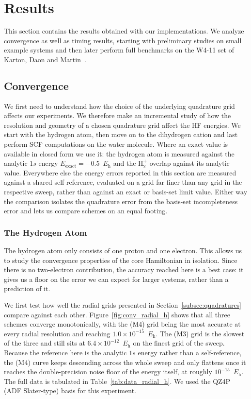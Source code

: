 \documentclass{article}
\begin{document}
\section{Results}\label{sec:results}

This section contains the results obtained with our implementations.
We analyze convergence as well as timing results, starting with
preliminary studies on small example systems and then
later perform full benchmarks on the W4-11 set of Karton, Daon and
Martin~\cite{Karton11w411}.

\subsection{Convergence}\label{subsec:convergence}

We first need to understand how the choice of the underlying
quadrature grid affects our experiments. We therefore make an
incremental study of how the resolution and geometry of a chosen
quadrature grid affect the HF energies. We start with the hydrogen
atom, then move on to the dihydrogen cation and last
perform SCF computations on the water molecule. Where an exact value is
available in closed form we use it: the hydrogen atom is measured
against the analytic $1s$ energy $E_\mathrm{exact}=-0.5$~\( E_\mathrm
h \) and the
H$_2^+$ overlap against its analytic value. Everywhere else the energy
errors reported in this section are measured against a shared
self-reference, evaluated on a grid far finer than any grid in the
respective sweep, rather than against an exact or basis-set limit
value. Either way the comparison isolates the quadrature error from the
basis-set incompleteness error and lets us compare schemes on an equal
footing.

\subsubsection{The Hydrogen Atom}

The hydrogen atom only consists of one proton and one
electron. This allows us to study the convergence properties of the core
Hamiltonian in isolation. Since there is no two-electron contribution,
the accuracy reached here is a best case: it gives us a floor on the
error we can expect for larger systems, rather than a prediction of it.

We first test how well the radial grids presented in
Section~\ref{subsec:quadratures} compare against each other.
Figure~\ref{fig:conv_radial_h} shows that all three schemes converge
monotonically, with the (M4) grid being the most accurate at every
radial resolution and reaching \( 1.0 \times 10^{-15} \)~\( E_\mathrm
h \). The (M3)
grid is the slowest of the three and still sits at \( 6.4 \times
10^{-12} \)~\( E_\mathrm h \) on the finest grid of the sweep.
Because the reference
here is the analytic $1s$ energy rather than a self-reference, the (M4)
curve keeps descending across the whole sweep and only flattens once it
reaches the double-precision noise floor of the energy itself, at
roughly \( 10^{-15} \)~\( E_\mathrm h \). The full data is tabulated in
Table~\ref{tab:data_radial_h}. We used the QZ4P (ADF
Slater-type)\cite{VanLenthe2003} basis for this experiment.
\end{document}
